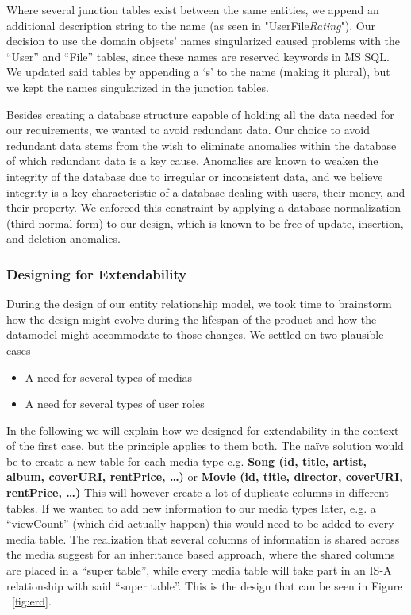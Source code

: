 Where several junction tables exist between the same entities, we append an additional description string to the name (as seen in "UserFile\textit{Rating}").
Our decision to use the domain objects' names singularized caused problems with the “User” and “File” tables, since these names are reserved keywords in MS SQL. We updated said tables by appending a ‘s’ to the name (making it plural), but we kept the names singularized in the junction tables.

Besides creating a database structure capable of holding all the data needed for our requirements, we wanted to avoid redundant data. Our choice to avoid redundant data stems from the wish to eliminate anomalies within the database of which redundant data is a key cause. Anomalies are known to weaken the integrity of the database \cite{dbbook} due to irregular or inconsistent data, and we believe integrity is a key characteristic of a database dealing with users, their money, and their property. We enforced this constraint by applying a database normalization (third normal form) to our design, which is known to be free of update, insertion, and deletion anomalies.

\subsubsection{Designing for Extendability}
\label{sec:extendability}
During the design of our entity relationship model, we took time to brainstorm how the design might evolve during the lifespan of the product and how the datamodel might accommodate to those changes. We settled on two plausible cases
\begin{itemize}
\item A need for several types of medias
\item A need for several types of user roles
\end{itemize}
In the following we will explain how we designed for extendability in the context of the first case, but the principle applies to them both.
The naïve solution would be to create a new table for each media type e.g. 
\textbf{Song (id, title, artist, album, coverURI, rentPrice, …)} or
\textbf{Movie (id, title, director, coverURI, rentPrice, …)}
This will however create a lot of duplicate columns in different tables. If we wanted to add new information to our media types later, e.g. a “viewCount” (which did actually happen) this would need to be added to every media table.
The realization that several columns of information is shared across the media suggest for an inheritance based approach, where the shared columns are placed in a “super table”, while every media table will take part in an IS-A relationship with said “super table”. This is the design that can be seen in Figure ~\ref{fig:erd}.

